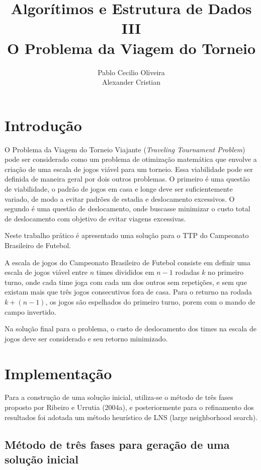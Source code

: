 \documentclass[12pt,a4paper]{article}
\author{Pablo Cecilio Oliveira\\
	Alexander Cristian}
\title{Algorítimos e Estrutura de Dados III\\
O Problema da Viagem do Torneio}
\date{}
\numberwithin{figure}{section}
\numberwithin{table}{section}
\begin{document}
\maketitle

\section{Introdução}

O Problema da Viagem do Torneio Viajante (\textit{Traveling Tournament Problem}) pode ser considerado como um problema de otimização matemática que envolve a criação de uma escala de jogos viável para um torneio. Essa viabilidade pode ser definida de maneira geral por dois outros problemas. O primeiro é uma questão de viabilidade, o padrão de jogos em casa e longe deve ser suficientemente variado, de modo a evitar padrões de estadia e deslocamento excessivos. O segundo é uma questão de deslocamento, onde buscasse minimizar o custo total de deslocamento com objetivo de evitar viagens excessivas.

Neste trabalho prático é apresentado uma solução para o TTP do Campeonato Brasileiro de Futebol.

A escala de jogos do Campeonato Brasileiro de Futebol consiste em definir uma escala de jogos viável entre $n$ times divididos em $n-1$ rodadas $k$ no primeiro turno, onde cada time joga com cada um dos outros sem repetições, e sem que existam mais que três jogos consecutivos fora de casa. Para o returno na rodada $k + (n - 1)$, os jogos são espelhados do primeiro turno, porem com o mando de campo invertido.

Na solução final para o problema, o custo de deslocamento dos times na escala de jogos deve ser considerado e seu retorno minimizado.

\section{Implementação}

Para a construção de uma solução inicial, utiliza-se o método de três fases proposto por Ribeiro e Urrutia (2004a)\cite{urrutia:heuristics}, e posteriormente para o refinamento dos resultados foi adotada um método heurístico de LNS (large neighborhood search).

\subsection{Método de três fases para geração de uma solução inicial}
\end{document}
